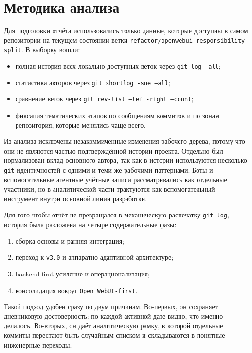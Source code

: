 \documentclass[12pt,a4paper]{article}
\begin{document}
\section{Методика анализа}

Для подготовки отчёта использовались только данные, которые доступны в самом репозитории на текущем состоянии ветки \texttt{refactor/openwebui-responsibility-split}. В выборку вошли:

\begin{itemize}
\item полная история всех локально доступных веток через \texttt{git log --all};
\item статистика авторов через \texttt{git shortlog -sne --all};
\item сравнение веток через \texttt{git rev-list --left-right --count};
\item фиксация тематических этапов по сообщениям коммитов и по зонам репозитория, которые менялись чаще всего.
\end{itemize}

Из анализа исключены незакоммиченные изменения рабочего дерева, потому что они не являются частью подтверждённой истории проекта. Отдельно был нормализован вклад основного автора, так как в истории используются несколько \texttt{git}-идентичностей с одними и теми же рабочими паттернами. Боты и вспомогательные агентные учётные записи рассматривались как отдельные участники, но в аналитической части трактуются как вспомогательный инструмент внутри основной линии разработки.

Для того чтобы отчёт не превращался в механическую распечатку \texttt{git log}, история была разложена на четыре содержательные фазы:

\begin{enumerate}
\item сборка основы и ранняя интеграция;
\item переход к \texttt{v3.0} и аппаратно-адаптивной архитектуре;
\item backend-first усиление и операционализация;
\item консолидация вокруг \texttt{Open WebUI-first}.
\end{enumerate}

Такой подход удобен сразу по двум причинам. Во-первых, он сохраняет дневниковую достоверность: по каждой активной дате видно, что именно делалось. Во-вторых, он даёт аналитическую рамку, в которой отдельные коммиты перестают быть случайным списком и складываются в понятные инженерные переходы.
\end{document}
